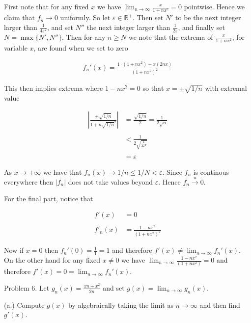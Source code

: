 \documentclass{article}
\begin{document}
  \vspace{1cm}

  First note that for any fixed $x$ we have $\lim_{n\to \infty}\frac{x}{1+nx^2} = 0$ pointwise.  Hence we claim that $f_n\to 0$ uniformly.  So let $\varepsilon\in\mathbb R^+$.  Then set $N'$ to be the next integer larger than $\frac{1}{4\varepsilon^2}$, and set $N''$ the next integer larger than $\frac 1 {2\varepsilon}$, and finally set $N=\max\{N',N''\}$.  Then for any $n\geq N$ we note that the extrema of $\frac{x}{1+nx^2}$, for variable $x$, are found when we set to zero

  \begin{align*}
    f_n'(x)=\frac{1\cdot(1+nx^2)-x(2nx)}{(1+nx^2)^2}
  \end{align*}

  This then implies extrema where $1-nx^2=0$ so that $x=\pm\sqrt{1/n}$ with extremal value 

  \begin{align*}
    \left|\frac{\pm\sqrt{1/n}}{1+n\sqrt{1/n}^2}\right|&=\frac{\sqrt{1/n}}{2}=\frac{1}{2\sqrt n} \\\\
    &< \frac{1}{2\sqrt{\frac{1}{4\varepsilon^2}}} \\\\
    &= \varepsilon
  \end{align*}

  As $x\to \pm \infty$ we have that $f_n(x)\to 1/n \leq 1/N < \varepsilon$.  Since $f_n$ is continous everywhere then $|f_n|$ does not take values beyond $\varepsilon$. Hence $f_n\xrightarrow{u} 0$.

  For the final part, notice that 

  \begin{align*}
    f'(x)&=0 \\\\
    f'_n(x)&=\frac{1-nx^2}{(1+nx^2)^2}
  \end{align*}

  Now if $x=0$ then $f_n'(0)=\frac{1}{1}=1$ and therefore $f'(x)\ne \lim_{n\to \infty}f_n'(x)$.  On the other hand for any fixed $x\ne 0$ we have $\lim_{n\to \infty}\frac{1-nx^2}{(1+nx^2)} = 0$ and therefore $f'(x)=0=\lim_{n\to \infty}f_n'(x)$.

  \pagebreak

  {\Large \color{Sepia} Problem 6. Let $g_n(x) = \frac{xn+x^2}{2n}$ and set $g(x)=\displaystyle\lim_{n\to \infty}g_n(x)$.
  
  (a.) Compute $g(x)$ by algebraically taking the limit as $n\to \infty$ and then find $g'(x)$.}
\end{document}
